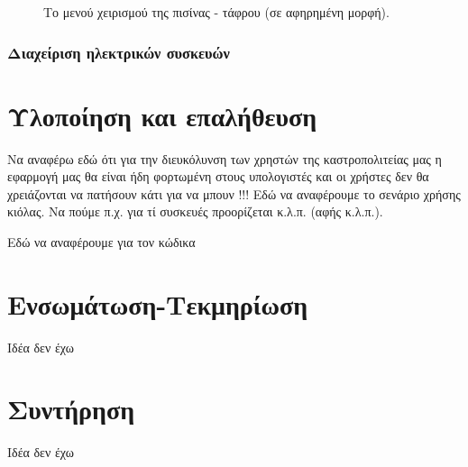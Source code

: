 \documentclass{assignment}
\begin{document}
\begin{figure}
\begin{center}
\caption{Το μενού χειρισμού της πισίνας - τάφρου (σε αφηρημένη μορφή).}
\label{fig:menu:pisina}
\end{center}
\end{figure}

\subsubsection{Διαχείριση ηλεκτρικών συσκευών}

\section{Υλοποίηση και επαλήθευση}

Να αναφέρω εδώ ότι για την διευκόλυνση των χρηστών της καστροπολιτείας μας η εφαρμογή μας θα είναι ήδη φορτωμένη στους υπολογιστές και οι χρήστες δεν θα χρειάζονται να πατήσουν κάτι για να μπουν !!!
Εδώ να αναφέρουμε το σενάριο χρήσης κιόλας. Να πούμε π.χ. για τί συσκευές προορίζεται κ.λ.π. (αφής κ.λ.π.).

Εδώ να αναφέρουμε για τον κώδικα

\section{Ενσωμάτωση-Τεκμηρίωση}

Ιδέα δεν έχω

\section{Συντήρηση}

Ιδέα δεν έχω

 \label{Βιβλιογραφία}



\newpage
\end{document}
